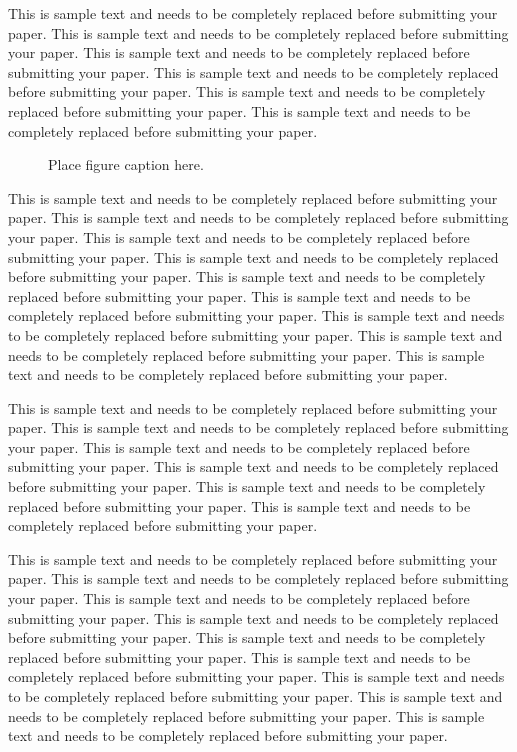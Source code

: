 \documentclass[11pt]{asaproc}
\begin{document}
This is sample text and needs to be completely replaced before submitting your paper. This is sample text and needs to be completely replaced before submitting your paper. This is sample text and needs to be completely replaced before submitting your paper. This is sample text and needs to be completely replaced before submitting your paper. This is sample text and needs to be completely replaced before submitting your paper. This is sample text and needs to be completely replaced before submitting your paper.

\begin{figure}[t]
\caption{Place figure caption here.}
\end{figure}

This is sample text and needs to be completely replaced before submitting your paper. This is sample text and needs to be completely replaced before submitting your paper. This is sample text and needs to be completely replaced before submitting your paper. This is sample text and needs to be completely replaced before submitting your paper. This is sample text and needs to be completely replaced before submitting your paper. This is sample text and needs to be completely replaced before submitting your paper. This is sample text and needs to be completely replaced before submitting your paper. This is sample text and needs to be completely replaced before submitting your paper. This is sample text and needs to be completely replaced before submitting your paper. 

This is sample text and needs to be completely replaced before submitting your paper. This is sample text and needs to be completely replaced before submitting your paper. This is sample text and needs to be completely replaced before submitting your paper. This is sample text and needs to be completely replaced before submitting your paper. This is sample text and needs to be completely replaced before submitting your paper. This is sample text and needs to be completely replaced before submitting your paper.

This is sample text and needs to be completely replaced before submitting your paper. This is sample text and needs to be completely replaced before submitting your paper. This is sample text and needs to be completely replaced before submitting your paper. This is sample text and needs to be completely replaced before submitting your paper. This is sample text and needs to be completely replaced before submitting your paper. This is sample text and needs to be completely replaced before submitting your paper. This is sample text and needs to be completely replaced before submitting your paper. This is sample text and needs to be completely replaced before submitting your paper. This is sample text and needs to be completely replaced before submitting your paper. 
\end{document}
